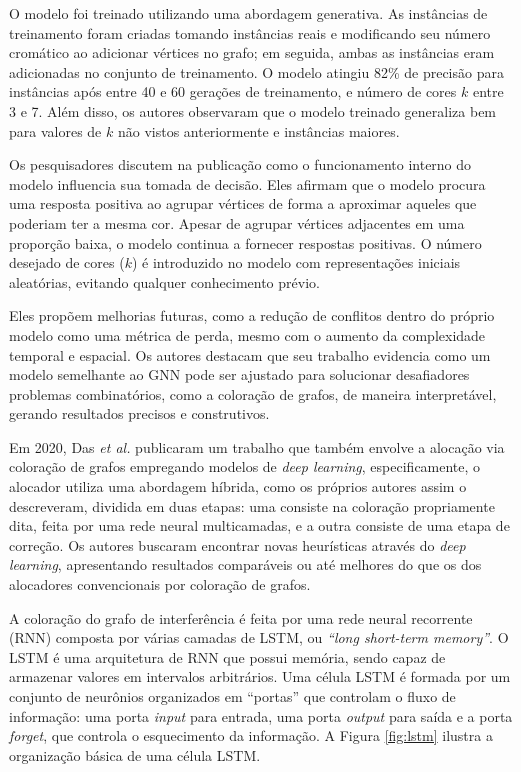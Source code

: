 \documentclass[
	12pt,				%
	openright,			%
	oneside,			%
	a4paper,			%
	tccpreliminar,			%
	]{ABNT-DC-UEL}
\begin{document}
O modelo foi treinado utilizando uma abordagem generativa. As instâncias de treinamento foram criadas tomando instâncias reais e modificando seu número cromático ao adicionar vértices no grafo; em seguida, ambas as instâncias eram adicionadas no conjunto de treinamento. O modelo atingiu 82\% de precisão para instâncias após entre 40 e 60 gerações de treinamento, e número de cores $k$ entre 3 e 7. Além disso, os autores observaram que o modelo treinado generaliza bem para valores de $k$ não vistos anteriormente e instâncias maiores.

Os pesquisadores discutem na publicação como o funcionamento interno do modelo influencia sua tomada de decisão. Eles afirmam que o modelo procura uma resposta positiva ao agrupar vértices de forma a aproximar aqueles que poderiam ter a mesma cor. Apesar de agrupar vértices adjacentes em uma proporção baixa, o modelo continua a fornecer respostas positivas. O número desejado de cores ($k$) é introduzido no modelo com representações iniciais aleatórias, evitando qualquer conhecimento prévio.

Eles propõem melhorias futuras, como a redução de conflitos dentro do próprio modelo como uma métrica de perda, mesmo com o aumento da complexidade temporal e espacial. Os autores destacam que seu trabalho evidencia como um modelo semelhante ao GNN pode ser ajustado para solucionar desafiadores problemas combinatórios, como a coloração de grafos, de maneira interpretável, gerando resultados precisos e construtivos.

Em 2020, Das \textit{et al.} \cite{das:20} publicaram um trabalho que também envolve a alocação via coloração de grafos empregando modelos de \textit{deep learning}, especificamente, o alocador utiliza uma abordagem híbrida, como os próprios autores assim o descreveram, dividida em duas etapas: uma consiste na coloração propriamente dita, feita por uma rede neural multicamadas, e a outra consiste de uma etapa de correção. Os autores buscaram encontrar novas heurísticas através do \textit{deep learning}, apresentando resultados comparáveis ou até melhores do que os dos alocadores convencionais por coloração de grafos.

A coloração do grafo de interferência é feita por uma rede neural recorrente (RNN) composta por várias camadas de LSTM, ou \textit{``long short-term memory''}. O LSTM é uma arquitetura de RNN que possui memória, sendo capaz de armazenar valores em intervalos arbitrários. Uma célula LSTM é formada por um conjunto de neurônios organizados em ``portas'' que controlam o fluxo de informação: uma porta \textit{input} para entrada, uma porta \textit{output} para saída e a porta \textit{forget}, que controla o esquecimento da informação. A Figura \ref{fig:lstm} ilustra a organização básica de uma célula LSTM.
\end{document}
